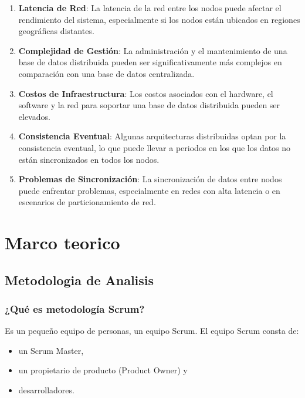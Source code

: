 \documentclass[spanish, 12pt]{article}
\providecommand{\tightlist}{\setlength{\itemsep}{0pt}
\setlength{\parskip}{0pt}}
\begin{document}
	\begin{enumerate}
		\def\labelenumi{\arabic{enumi}.} \tightlist

		\item \textbf{Latencia de Red}: La latencia de la red entre los nodos puede afectar
			el rendimiento del sistema, especialmente si los nodos están ubicados en
			regiones geográficas distantes.

		\item \textbf{Complejidad de Gestión}: La administración y el mantenimiento de
			una base de datos distribuida pueden ser significativamente más complejos en
			comparación con una base de datos centralizada.

		\item \textbf{Costos de Infraestructura}: Los costos asociados con el hardware,
			el software y la red para soportar una base de datos distribuida pueden
			ser elevados.

		\item \textbf{Consistencia Eventual}: Algunas arquitecturas distribuidas optan
			por la consistencia eventual, lo que puede llevar a periodos en los que
			los datos no están sincronizados en todos los nodos.

		\item \textbf{Problemas de Sincronización}: La sincronización de datos entre
			nodos puede enfrentar problemas, especialmente en redes con alta latencia
			o en escenarios de particionamiento de red.
	\end{enumerate}

	\section{Marco teorico}
	\label{marco-teorico}

	\subsection{Metodologia de Analisis}
	\label{metodologia-de-analisis}

	\subsubsection{¿Qué es metodología Scrum?}
	\label{quuxe9-es-metodologuxeda-scrum}

	Es un pequeño equipo de personas, un equipo Scrum. El equipo Scrum consta de:

	\begin{itemize}
		\tightlist

		\item un Scrum Master,

		\item un propietario de producto (Product Owner) y

		\item desarrolladores.
	\end{itemize}
\end{document}
